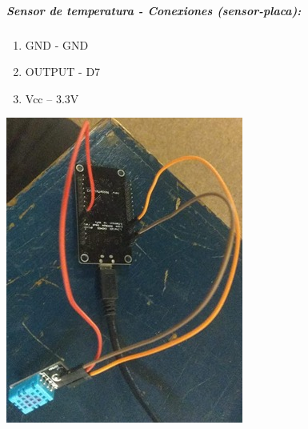 \documentclass[12pt]{article} %
\newcommand{\normalsubparagraph}[1]{\subparagraph{\textnormal{#1}}}
\begin{document}

\normalsubparagraph {Sensor de temperatura - Conexiones (sensor-placa):}
\begin{enumerate}[itemsep=1pt]
    \item GND - GND
    \item OUTPUT - D7
    \item Vcc – 3.3V
\end{enumerate}

\begin{center}
\begin{minipage}[c]{0.3\textwidth} %
  \centering
  \includegraphics[width=\linewidth]{Pictures/Sensor temperatura.jpg}
  \label{fig:sensor-temperatura}
\end{minipage}
\end{center}
\end{document}
